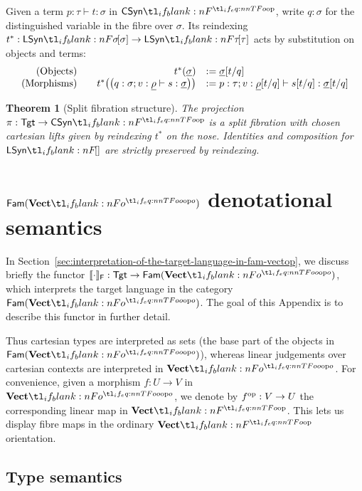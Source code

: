 \documentclass[11pt,a4paper]{article}
\newtheorem{theorem}{Theorem}[section]
\theoremstyle{definition}
\theoremstyle{remark}
\providecommand{\Fam}[1]{\mathsf{Fam}(#1)}
\providecommand{\casubst}[3]{#1[#3/#2]}
\providecommand{\lintype}[1]{\underline{#1}}
\providecommand{\fvoint}[1]{\llbracket #1\rrbracket_{\cat[]{F}}}
\providecommand{\Tgt}{\mathsf{Tgt}}
\begin{document}
Given a term \( p: \tau \vdash t : \sigma \) in \( \CSyn \), write
\(q:\sigma\) for the distinguished variable in the fibre over \(\sigma\).
Its reindexing \( t^{\ast}: \LSyn[\sigma] \to \LSyn[\tau] \) acts by substitution on objects and terms:
\begin{equation*}
  \begin{array}{rrl}
    \left( \text{Objects} \right) 
    &\quad
      \Fun[nn]{ t^{\ast} }{ \lintype{\sigma} }
    &:=
      \casubst{\lintype{\sigma}}{q}{t}
    \\
    \left( \text{Morphisms} \right) 
    &\quad
      \Fun[nn]{ t^{\ast} }{
      \left( q : \sigma; v : \lintype{\rho} \vdash s : \lintype{\sigma} \right)
      }
    &:=
      p : \tau; v : \casubst{\lintype{\rho}}{q}{t}
      \vdash
      \casubst{s}{q}{t} : \casubst{\lintype{\sigma}}{q}{t}
  \end{array}
\end{equation*}

\begin{theorem}[Split fibration structure]
  The projection \( \pi: \Tgt \to \CSyn \) is a split fibration with chosen cartesian lifts given by reindexing \( t^{\ast} \) on the nose. Identities and composition for \( \LSyn \) are strictly preserved by reindexing.
\end{theorem}


\section{\texorpdfstring{\( \Fam{\Vect[o]} \)}{Fam(VectOp)} denotational semantics}
\label{sec:appendix-fam-vectop-denotational-semantics}

In Section~\ref{sec:interpretation-of-the-target-language-in-fam-vectop}, we discuss briefly the functor \( \fvoint{\cdot}: \Tgt \to \Fam{\Vect[o]} \), which interprets the target language in the category \( \Fam{\Vect[o]} \). The goal of this Appendix is to describe this functor in further detail.

Thus cartesian types are interpreted as sets (the base part of the objects in \( \Fam{\Vect[o]} \)), whereas linear judgements over cartesian contexts are interpreted in \( \Vect[o] \). For convenience, given a morphism \( f: U \to V \) in \( \Vect[o] \), we denote by \( \opmor{f}: V \to U \) the corresponding linear map in \( \Vect \). This lets us display fibre maps in the ordinary \( \Vect \) orientation.

\subsection{Type semantics}
\end{document}
